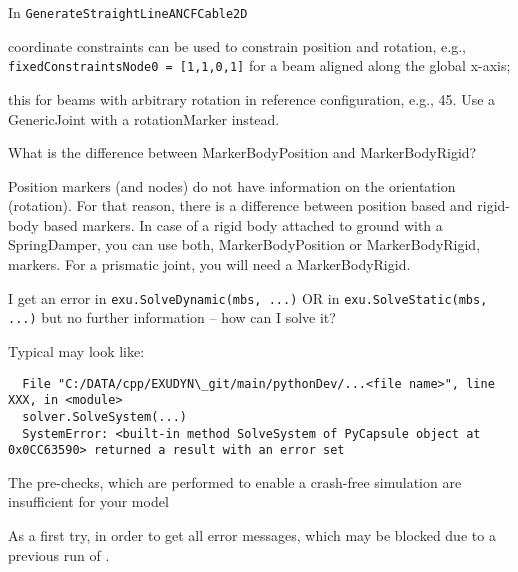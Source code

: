 \ei
\item In \texttt{GenerateStraightLineANCFCable2D} 
\bi
\item[$\ra$] coordinate constraints can be used to constrain position and rotation, e.g., \texttt{fixedConstraintsNode0 = [1,1,0,1]} for a beam aligned along the global x-axis; 
\item[$\ra$] this  for beams with arbitrary rotation in reference configuration, e.g., 45\textdegree. Use a GenericJoint with a rotationMarker instead.
\ei
\item What is the difference between MarkerBodyPosition and MarkerBodyRigid?
\bi
\item[$\ra$] Position markers (and nodes) do not have information on the orientation (rotation). For that reason, there is a difference between position based and rigid-body based markers. In case of a rigid body attached to ground with a SpringDamper, you can use both, MarkerBodyPosition or MarkerBodyRigid, markers. For a prismatic joint, you will need a MarkerBodyRigid.
\ei
\item I get an error in \texttt{exu.SolveDynamic(mbs, ...)} OR in \texttt{exu.SolveStatic(mbs, ...)} but no further information -- how can I solve it?
\bi
\item[$\ra$] Typical  may look like:
\begin{lstlisting}
  File "C:/DATA/cpp/EXUDYN\_git/main/pythonDev/...<file name>", line XXX, in <module>
  solver.SolveSystem(...)
  SystemError: <built-in method SolveSystem of PyCapsule object at 0x0CC63590> returned a result with an error set
\end{lstlisting}
%
\item[$\ra$] The pre-checks, which are performed to enable a crash-free simulation are insufficient for your model
%
\item[$\ra$] As a first try,  in order to get all error messages, which may be blocked due to a previous run of \codeName.
